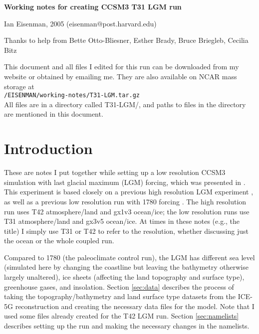 \documentclass[authoryear,round,12pt]{article}
\begin{document}
\begin{center}
{\Large \bf Working notes for creating CCSM3 T31 LGM run}

\medskip

Ian Eisenman, 2005 (eisenman@post.harvard.edu)

\medskip

Thanks to help from Bette Otto-Bliesner, Esther Brady, Bruce Briegleb,
Cecilia Bitz

\end{center}

\medskip

\noindent This document and all files I edited for this run can be downloaded from my website or obtained by emailing me. They are also available on NCAR mass storage at\\
\verb+/EISENMAN/working-notes/T31-LGM.tar.gz+\\
All files are in a directory called T31-LGM/, and paths to files in the directory are mentioned in this document.

\medskip

\section{Introduction}

These are notes I put together while setting up a low resolution CCSM3
simulation with last glacial maximum (LGM) forcing, which was presented in \citet{Eisenman-Bitz-Tziperman-2007:rain}.  This experiment
is based closely on a previous high resolution LGM experiment
\citep{Otto-Bliesner-Brady-Clauzet-et-al-2006:last}, as well as a
previous low resolution run with 1780 forcing
\citep{Otto-Bliesner-Tomas-Brady-et-al-2006:climate}. The high
resolution run uses T42 atmosphere/land and gx1v3 ocean/ice; the low
resolution runs use T31 atmosphere/land and gx3v5 ocean/ice. At times
in these notes (e.g., the title) I simply use T31 or T42 to refer to
the resolution, whether discussing just the ocean or the whole coupled
run.

Compared to 1780 (the paleoclimate control run), the LGM has different
sea level (simulated here by changing the coastline but leaving the
bathymetry otherwise largely unaltered), ice sheets (affecting the
land topography and surface type), greenhouse gases, and insolation.
Section \ref{sec:data} describes the process of taking the
topography/bathymetry and land surface type datasets from the ICE-5G
reconstruction \citep{Peltier-2004:global} and creating the necessary
data files for the model. Note that I used some files already created
for the T42 LGM run. Section \ref{sec:namelists} describes setting up
the run and making the necessary changes in the namelists.
\end{document}
